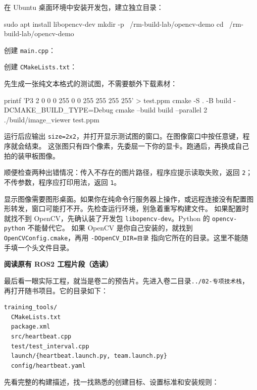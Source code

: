 \begin{example}[从零编译并显示图像]
在 Ubuntu 桌面环境中安装开发包，建立独立目录：
\begin{tbash}
sudo apt install libopencv-dev
mkdir -p ~/rm-build-lab/opencv-demo
cd ~/rm-build-lab/opencv-demo
\end{tbash}
创建 \texttt{main.cpp}：


创建 \texttt{CMakeLists.txt}：


先生成一张纯文本格式的测试图，不需要额外下载素材：
\begin{tbash}
printf 'P3 2 0 0  0 255 0 0 255  255 255 255\n' > test.ppm
cmake -S . -B build -DCMAKE_BUILD_TYPE=Debug
cmake --build build --parallel 2
./build/image_viewer test.ppm
\end{tbash}
运行后应输出 \texttt{size=2x2}，并打开显示测试图的窗口。在图像窗口中按任意键，程序就会结束。
这张图只有四个像素，先委屈一下你的显卡。跑通后，再换成自己拍的装甲板图像。

顺便检查两种出错情况：传入不存在的图片路径，程序应提示读取失败，返回 \texttt{2}；不传参数，程序应打印用法，返回 \texttt{1}。
\end{example}

\begin{note}
显示图像需要图形桌面。如果你在纯命令行服务器上操作，或远程连接没有配置图形转发，窗口可能打不开。先检查运行环境，别急着重写构建文件。
如果配置时就找不到 OpenCV，先确认装了开发包 \texttt{libopencv-dev}。Python 的 \texttt{opencv-python} 不能替代它。
如果 OpenCV 是你自己安装的，就找到 \texttt{OpenCVConfig.cmake}，再用 \texttt{-DOpenCV\_DIR=目录} 指向它所在的目录。这里不能随手填一个头文件目录。
\end{note}

\textbf{阅读原有 ROS2 工程片段（选读）}

最后看一眼实际工程，就当是卷二的预告片。先进入卷二目录\texttt{../02-专项技术栈}，再打开随书项目。它的目录如下：
\begin{lstlisting}[language={}]
training_tools/
  CMakeLists.txt
  package.xml
  src/heartbeat.cpp
  test/test_interval.cpp
  launch/{heartbeat.launch.py, team.launch.py}
  config/heartbeat.yaml
\end{lstlisting}
先看完整的构建描述，找一找熟悉的创建目标、设置标准和安装规则：


